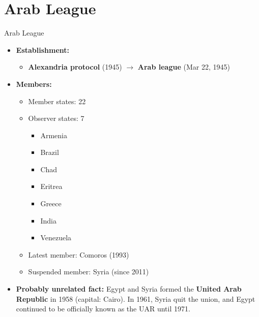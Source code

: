 \documentclass[
  10pt,
  ignorenonframetext,
  progressbar=frametitle]{beamer}
\providecommand{\tightlist}{%
  \setlength{\itemsep}{0pt}\setlength{\parskip}{0pt}}
\begin{document}
\section{Arab League}
\begin{frame}[allowframebreaks]
{Arab League}
\protect\hypertarget{arab-league}{}
\begin{itemize}
\tightlist
\item
  \textbf{Establishment:}

  \begin{itemize}
  \tightlist
  \item
    \textbf{Alexandria protocol} (1945) \(\rightarrow\) \textbf{Arab
    league} (Mar 22, 1945)
  \end{itemize}
\item
  \textbf{Members:}

  \begin{itemize}
  \tightlist
  \item
    Member states: 22
  \item
    Observer states: 7

    \begin{itemize}
    \tightlist
    \item
      Armenia
    \item
      Brazil
    \item
      Chad
    \item
      Eritrea
    \item
      Greece
    \item
      India
    \item
      Venezuela
    \end{itemize}
  \item
    Latest member: Comoros (1993)
  \item
    Suspended member: Syria (since 2011)
  \end{itemize}
\item
  \textbf{Probably unrelated fact:} Egypt and Syria formed the
  \textbf{United Arab Republic} in 1958 (capital: Cairo). In 1961, Syria
  quit the union, and Egypt continued to be officially known as the UAR
  until 1971.
\end{itemize}
\end{frame}
\end{document}
